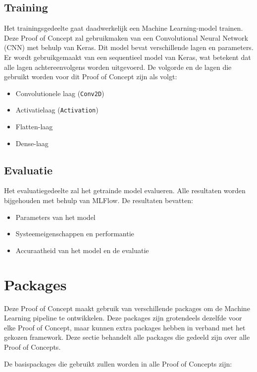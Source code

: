 \subsection{Training}

Het trainingsgedeelte gaat daadwerkelijk een Machine Learning-model trainen. Deze Proof of Concept zal gebruikmaken van een Convolutional Neural Network (CNN) met behulp van Keras. Dit model bevat verschillende lagen en parameters. Er wordt gebruikgemaakt van een sequentieel model van Keras, wat betekent dat alle lagen achtereenvolgens worden uitgevoerd. De volgorde en de lagen die gebruikt worden voor dit Proof of Concept zijn als volgt:

\begin{itemize}
    \item Convolutionele laag (\texttt{Conv2D})
    \item Activatielaag (\texttt{Activation})
    \item Flatten-laag
    \item Dense-laag
\end{itemize}

\subsection{Evaluatie}

Het evaluatiegedeelte zal het getrainde model evalueren. Alle resultaten worden bijgehouden met behulp van MLFlow. De resultaten bevatten:

\begin{itemize}
    \item Parameters van het model
    \item Systeemeigenschappen en performantie
    \item Accuraatheid van het model en de evaluatie
\end{itemize}

\section{Packages}

Deze Proof of Concept maakt gebruik van verschillende packages om de Machine Learning pipeline te ontwikkelen. Deze packages zijn grotendeels dezelfde voor elke Proof of Concept, maar kunnen extra packages hebben in verband met het gekozen framework. Deze sectie behandelt alle packages die gedeeld zijn over alle Proof of Concepts.

De basispackages die gebruikt zullen worden in alle Proof of Concepts zijn:

